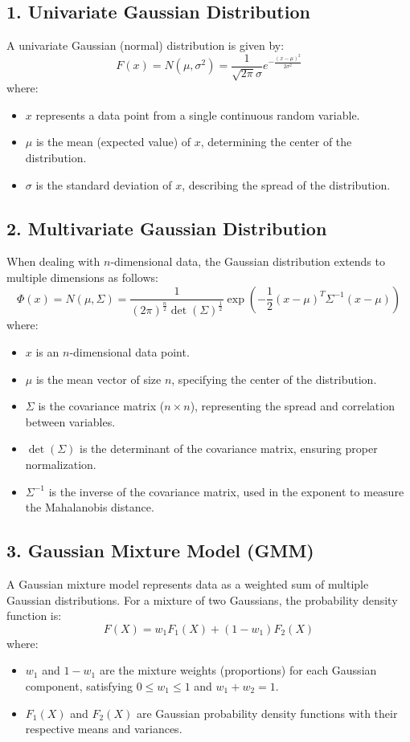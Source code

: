 \documentclass{article}
\begin{document}
\subsection*{1. Univariate Gaussian Distribution}
A univariate Gaussian (normal) distribution is given by:
\[
F(x) = N(\mu,\sigma^2) = \frac{1}{\sqrt{2\pi}\sigma} e^{-\frac{(x - \mu)^2}{2\sigma^2}}
\]
where:
\begin{itemize}
    \item \(x\) represents a data point from a single continuous random variable.
    \item \(\mu\) is the mean (expected value) of \(x\), determining the center of the distribution.
    \item \(\sigma\) is the standard deviation of \(x\), describing the spread of the distribution.
\end{itemize}

\subsection*{2. Multivariate Gaussian Distribution}
When dealing with \(n\)-dimensional data, the Gaussian distribution extends to multiple dimensions as follows:
\[
\Phi(x) = N(\mu, \Sigma) = \frac{1}{(2\pi)^{\frac{n}{2}} \det(\Sigma)^{\frac{1}{2}}} \exp \left( -\frac{1}{2} (x - \mu)^T \Sigma^{-1} (x - \mu) \right)
\]
where:
\begin{itemize}
    \item \(x\) is an \(n\)-dimensional data point.
    \item \(\mu\) is the mean vector of size \(n\), specifying the center of the distribution.
    \item \(\Sigma\) is the covariance matrix (\(n \times n\)), representing the spread and correlation between variables.
    \item \(\det(\Sigma)\) is the determinant of the covariance matrix, ensuring proper normalization.
    \item \(\Sigma^{-1}\) is the inverse of the covariance matrix, used in the exponent to measure the Mahalanobis distance.
\end{itemize}

\subsection*{3. Gaussian Mixture Model (GMM)}
A Gaussian mixture model represents data as a weighted sum of multiple Gaussian distributions. For a mixture of two Gaussians, the probability density function is:
\[
F(X) = w_1F_1(X) + (1-w_1)F_2(X)
\]
where:
\begin{itemize}
    \item \(w_1\) and \(1 - w_1\) are the mixture weights (proportions) for each Gaussian component, satisfying \(0 \leq w_1 \leq 1\) and \(w_1 + w_2 = 1\).
    \item \(F_1(X)\) and \(F_2(X)\) are Gaussian probability density functions with their respective means and variances.
\end{itemize}
\end{document}
